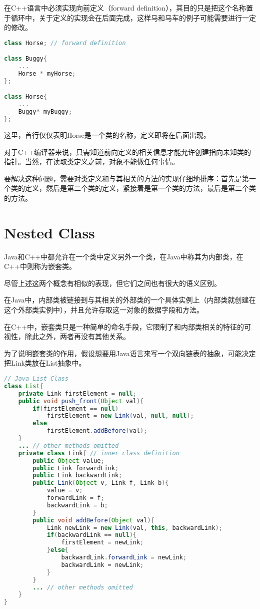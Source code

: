 在C++语言中必须实现向前定义（forward definition），其目的只是把这个名称置于循环中，关于定义的实现会在后面完成，这样马和马车的例子可能需要进行一定的修改。

\begin{lstlisting}[language=C++]
class Horse; // forward definition

class Buggy{
	...
	Horse * myHorse;
};

class Horse{
	...
	Buggy* myBuggy;
};
\end{lstlisting}

这里，首行仅仅表明Horse是一个类的名称，定义即将在后面出现。

对于C++编译器来说，只需知道前向定义的相关信息才能允许创建指向未知类的指针。当然，在读取类定义之前，对象不能做任何事情。

要解决这种问题，需要对类定义和与其相关的方法的实现仔细地排序：首先是第一个类的定义，然后是第二个类的定义，紧接着是第一个类的方法，最后是第二个类的方法。

\section{Nested Class}

Java和C++中都允许在一个类中定义另外一个类，在Java中称其为内部类，在C++中则称为嵌套类。


尽管上述这两个概念有相似的表现，但它们之间也有很大的语义区别。

在Java中，内部类被链接到与其相关的外部类的一个具体实例上（内部类就创建在这个外部类实例中），并且允许存取这一对象的数据字段和方法。

在C++中，嵌套类只是一种简单的命名手段，它限制了和内部类相关的特征的可视性，除此之外，两者再没有其他关系。

为了说明嵌套类的作用，假设想要用Java语言来写一个双向链表的抽象，可能决定把Link类放在List抽象中。



\begin{lstlisting}[language=Java]
// Java List Class
class List{
	private Link firstElement = null;
	public void push_front(Object val){
		if(firstElement == null)
			firstElement = new Link(val, null, null);
		else
			firstElement.addBefore(val);
	}
	... // other methods omitted 
	private class Link{ // inner class definition
		public Object value;
		public Link forwardLink;
		public Link backwardLink;
		public Link(Object v, Link f, Link b){
			value = v;
			forwardLink = f;
			backwardLink = b;
		}
		public void addBefore(Object val){
			Link newLink = new Link(val, this, backwardLink);
			if(backwardLink == null){
				firstElement = newLink;
			}else{
				backwardLink.forwardLink = newLink;
				backwardLink = newLink;
			}
		}
		... // other methods omitted
	}
}
\end{lstlisting}

